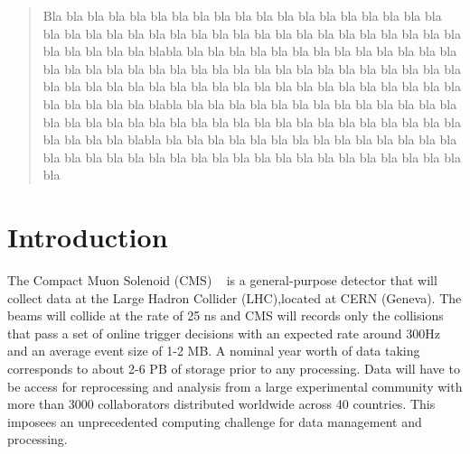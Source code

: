 \date{Received: date / Accepted: date}


\maketitle

\begin{abstract}
Bla bla bla bla bla bla bla bla bla bla bla bla bla bla bla bla bla bla bla bla bla bla bla bla bla bla bla bla bla bla bla bla bla bla bla bla bla bla bla bla bla bla bla bla blabla bla bla bla bla bla bla bla bla bla bla bla bla bla bla bla bla bla bla bla bla bla bla bla bla bla bla bla bla bla bla bla bla bla bla bla bla bla bla bla bla bla bla bla bla bla bla bla bla bla bla bla bla bla bla bla bla bla bla blabla bla bla bla bla bla bla bla bla bla bla bla bla bla bla bla bla bla bla bla bla bla bla bla bla bla bla bla bla bla bla bla bla bla bla bla bla bla blabla bla bla bla bla bla bla bla bla bla bla bla bla bla bla bla bla bla bla bla bla bla bla bla bla bla bla bla bla bla bla bla bla bla bla bla
\end{abstract}

\section{Introduction}
\label{intro}
The Compact Muon Solenoid (CMS) ~\cite{RefCMS} is a general-purpose detector
that will collect data at the Large Hadron Collider (LHC),located at CERN
(Geneva).
The beams will collide at the rate of 25 ns and CMS will records only the collisions
that pass a set of %
online trigger decisions with an expected rate around 300Hz and an
average event size of 1-2 MB. A nominal year worth of data taking 
corresponds to about 2-6 PB of storage prior to any processing.
Data will have to be access for reprocessing and analysis from a
large experimental community with more than 3000 collaborators distributed
worldwide across 40 countries. This imposees an unprecedented computing
challenge for data management and processing.

